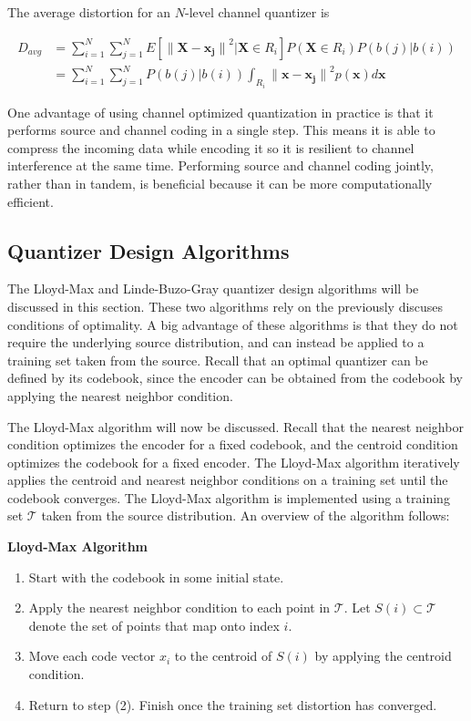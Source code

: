 \documentclass[10pt]{article}
\begin{document}
The average distortion for an $N$-level channel quantizer is

\begin{align}
D_{avg} &= \sum_{i=1}^{N} \sum_{j=1}^{N} E[ {\|\mathbf{X} - \mathbf{x_j}\|}^2 | \mathbf{X} \in R_i] P(\mathbf{X} \in R_i) P(b(j)|b(i))\\
&= \sum_{i=1}^{N} \sum_{j=1}^{N} P(b(j)|b(i)) \int_{R_i} {\|\mathbf{x} - \mathbf{x_j}\|}^2 p(\mathbf{x}) d\mathbf{x}
\end{align}

One advantage of using channel optimized quantization in practice is that it performs source and channel coding in a single step. This means it is able to compress the incoming data while encoding it so it is resilient to channel interference at the same time. Performing source and channel coding jointly, rather than in tandem, is beneficial because it can be more computationally efficient.

\subsection{Quantizer Design Algorithms}
\label{sec:quant_design_algos}
The Lloyd-Max and Linde-Buzo-Gray quantizer design algorithms will be discussed in this section. These two algorithms rely on the previously discuses conditions of optimality. A big advantage of these algorithms is that they do not require the underlying source distribution, and can instead be applied to a training set taken from the source. Recall that an optimal quantizer can be defined by its codebook, since the encoder can be obtained from the codebook by applying the nearest neighbor condition.

The Lloyd-Max algorithm will now be discussed. Recall that the nearest neighbor condition optimizes the encoder for a fixed codebook, and the centroid condition optimizes the codebook for a fixed encoder. The Lloyd-Max algorithm iteratively applies the centroid and nearest neighbor conditions on a training set until the codebook converges. The Lloyd-Max algorithm is implemented using a training set $\mathcal{T}$ taken from the source distribution. An overview of the algorithm follows:

\medskip

{\noindent \bf Lloyd-Max Algorithm}
\begin{enumerate}
\item Start with the codebook in some initial state.
\item Apply the nearest neighbor condition to each point in $\mathcal{T}$. Let $S(i) \subset \mathcal{T}$ denote the set of points that map onto index $i$.
\item Move each code vector $x_i$ to the centroid of $S(i)$ by applying the centroid condition.
\item Return to step (2). Finish once the training set distortion has converged.
\end{enumerate}
\end{document}
